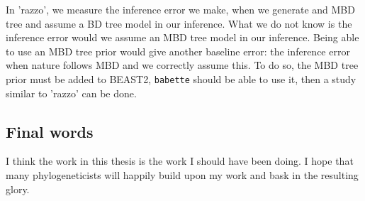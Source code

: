 In 'razzo', we measure the inference error we make, when we generate
and MBD tree and assume a BD tree model in our inference. What we
do not know is the inference error would we assume an MBD tree model in
our inference. Being able to use an MBD tree prior would give another
baseline error: the inference error when nature follows MBD and we
correctly assume this. To do so, the MBD tree prior must be added to BEAST2, 
\verb;babette; should be able to use it, then a study similar to 'razzo' can be done.

\subsection{Final words}

I think the work in this thesis is the work I should have been doing.
I hope that many phylogeneticists will happily build upon my work
and bask in the resulting glory.




